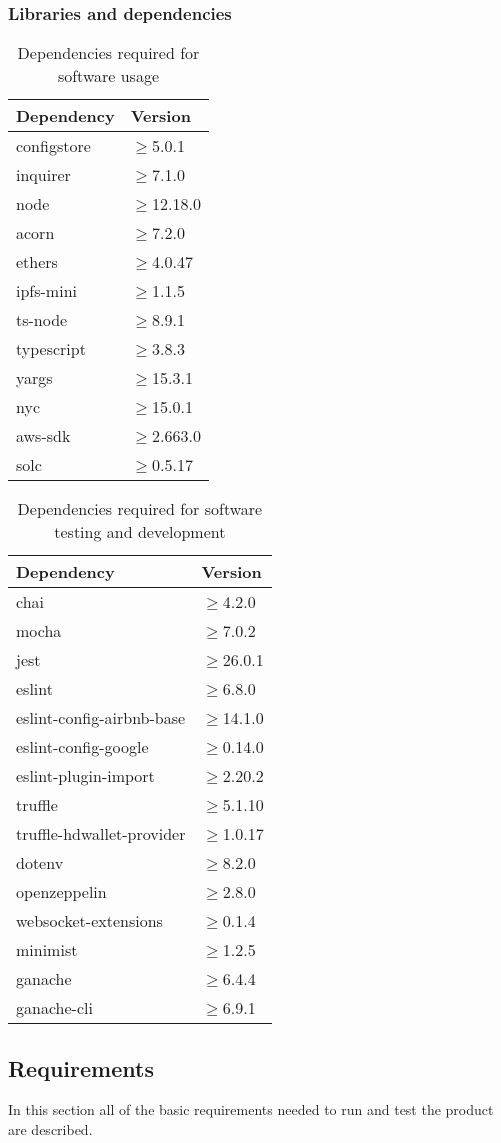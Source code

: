 \subsubsection{Libraries and dependencies}
\begin{longtable}[h!]{
		>{\centering\arraybackslash}p{}
		>{\centering\arraybackslash}p{} }
	\caption{Dependencies required for software usage} \\

	\textbf{\color{white}Dependency} &
	\textbf{\color{white}Version}
	\tabularnewline
	\endhead

	configstore & $\geq$5.0.1 \tabularnewline
	inquirer & $\geq$7.1.0 \tabularnewline
	node & $\geq$12.18.0 \tabularnewline
	acorn & $\geq$7.2.0 \tabularnewline
	ethers & $\geq$4.0.47 \tabularnewline
	ipfs-mini & $\geq$1.1.5 \tabularnewline
	ts-node & $\geq$8.9.1 \tabularnewline
	typescript & $\geq$3.8.3 \tabularnewline
	yargs & $\geq$15.3.1 \tabularnewline
	nyc & $\geq$15.0.1 \tabularnewline
	aws-sdk & $\geq$2.663.0 \tabularnewline
	solc & $\geq$0.5.17 \tabularnewline

\end{longtable}
\begin{longtable}{
		>{\centering\arraybackslash}p{}
		>{\centering\arraybackslash}p{} }
	\caption{Dependencies required for software testing and development} \\

	\textbf{\color{white}Dependency} &
	\textbf{\color{white}Version}
	\tabularnewline
	\endhead

	chai & $\geq$4.2.0 \tabularnewline
	mocha & $\geq$7.0.2 \tabularnewline
	jest & $\geq$26.0.1 \tabularnewline
	eslint & $\geq$6.8.0 \tabularnewline
	eslint-config-airbnb-base & $\geq$14.1.0 \tabularnewline
	eslint-config-google & $\geq$0.14.0 \tabularnewline
	eslint-plugin-import & $\geq$2.20.2 \tabularnewline
	truffle & $\geq$5.1.10 \tabularnewline
	truffle-hdwallet-provider & $\geq$1.0.17 \tabularnewline
	dotenv & $\geq$8.2.0 \tabularnewline
	openzeppelin & $\geq$2.8.0 \tabularnewline
	websocket-extensions & $\geq$0.1.4 \tabularnewline
	minimist & $\geq$1.2.5 \tabularnewline
	ganache & $\geq$6.4.4 \tabularnewline
	ganache-cli & $\geq$6.9.1 \tabularnewline

\end{longtable}
\subsection{Requirements}
In this section all of the basic requirements needed to run and test the product are described.
